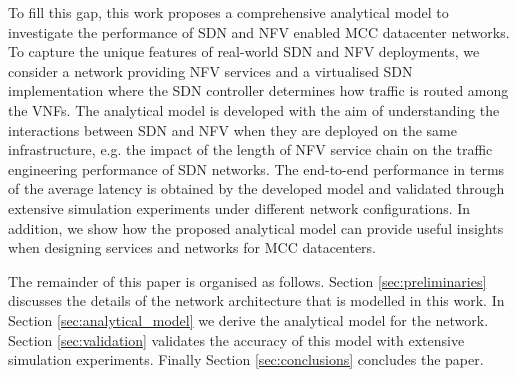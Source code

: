To fill this gap, this work proposes a comprehensive analytical model to investigate the performance of SDN and NFV enabled MCC datacenter networks. To capture the unique features of real-world SDN and NFV deployments, we consider a network providing NFV services and a virtualised SDN implementation where the SDN controller determines how traffic is routed among the VNFs. The analytical model is developed with the aim of understanding the interactions between SDN and NFV when they are deployed on the same infrastructure, e.g. the impact of the length of NFV service chain on the traffic engineering performance of SDN networks. The end-to-end performance in terms of the average latency is obtained by the developed model and validated through extensive simulation experiments under different network configurations. In addition, we show how the proposed analytical model can provide useful insights when designing services and networks for MCC datacenters.

The remainder of this paper is organised as follows. Section \ref{sec:preliminaries} discusses the details of the network architecture that is modelled in this work. In Section \ref{sec:analytical_model} we derive the analytical model for the network. Section \ref{sec:validation} validates the accuracy of this model with extensive simulation experiments. Finally Section \ref{sec:conclusions} concludes the paper.